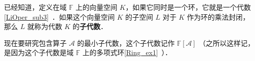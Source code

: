 
已经知道，定义在域 $\mathbb{F}$ 上的向量空间 $K$，如果它同时是一个环，它就是一个代数\autoref{LiOper_sub3}~．如果这个向量空间 $K$ 的子空间 $L$ 对于 $K$ 作为环的乘法封闭，那么 $L$ 就称为代数 $K$ 的\textbf{子代数}．

现在要研究包含算子 $\mathcal{A}$ 的最小子代数，这个子代数记作 $\mathbb{F}[\mathcal A]$ （之所以这样记，是因为这个子代数是域 $\mathbb{F}$ 上的多项式环\autoref{Ring_ex1}~）．